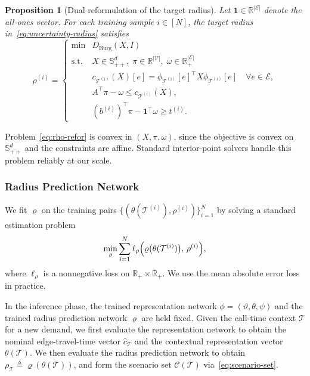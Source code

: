 \documentclass[11pt, letterpaper, oneside, reqno]{amsart}
\newcommand{\R}{\mathbb{R}}
\newcommand{\Let}{\triangleq}
\newtheorem{proposition}{Proposition}
\begin{document}
\begin{proposition}[Dual reformulation of the target radius]
\label{prop:rho-refor}
Let $\mathbf 1\in\R^{|\mathcal E|}$ denote the all-ones vector. For each training sample $i \in [N]$, the target radius in~\eqref{eq:uncertainty-radius} satisfies
\begin{equation}
\rho^{(i)}
= \left\{
\begin{array}{cl}
\displaystyle \min & D_{\mathrm{Burg}}(X,I) \\
\mathrm{s.t.} & X \in \mathbb S_{++}^d,\; \pi \in \R^{|\mathcal V|},\; \omega \in \R_+^{|\mathcal E|} \\
& c_{\mathcal T^{(i)}}(X)[e] = \phi_{\mathcal T^{(i)}}[e]^\top X \phi_{\mathcal T^{(i)}}[e]
\quad \forall e \in \mathcal E, \\
& A^\top \pi - \omega \le c_{\mathcal T^{(i)}}(X), \\
& (b^{(i)})^\top \pi - \mathbf 1^\top \omega \ge t^{(i)}.
\end{array}
\right.
\label{eq:rho-refor}
\end{equation}

\end{proposition}

Problem~\eqref{eq:rho-refor} is convex in $(X,\pi,\omega)$, since the objective is convex on $\mathbb S_{++}^d$ and the constraints are affine. Standard interior-point solvers handle this problem reliably at our scale.


\subsubsection{Radius Prediction Network}
We fit $\varrho$ on the training pairs $\{(\theta(\mathcal T^{(i)}), \rho^{(i)})\}_{i=1}^N$ by solving a standard estimation problem
\[
\min_{\varrho}
\sum_{i=1}^N
\ell_\rho\Bigl(\varrho\bigl(\theta(\mathcal T^{(i)})\bigr),\, \rho^{(i)}\Bigr),
\]
where $\ell_\rho$ is a nonnegative loss on $\R_+ \times \R_+$. We use the mean absolute error loss in practice.

In the inference phase, the trained representation network $\phi=(\vartheta,\theta,\psi)$ and the trained radius prediction network $\varrho$ are held fixed. Given the call-time context $\mathcal T$ for a new demand, we first evaluate the representation network to obtain the nominal edge-travel-time vector $\hat c_{\mathcal T}$ and the contextual representation vector $\theta(\mathcal T)$. We then evaluate the radius prediction network to obtain $\rho_{\mathcal T}\Let \varrho(\theta(\mathcal T))$, and form the scenario set $\mathcal C(\mathcal T)$ via~\eqref{eq:scenario-set}.
\end{document}

